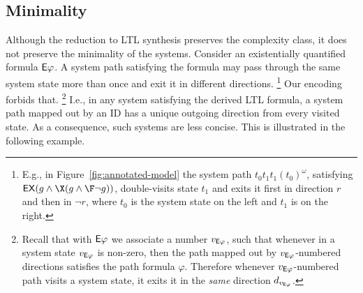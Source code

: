 \subsection*{Minimality}
Although the reduction to LTL synthesis preserves the complexity class,
it does not preserve the minimality of the systems.
Consider an existentially quantified formula ${\operatorname{\mathsf{E}}}\varphi$.
A system path satisfying the formula may pass through the same system state more than once
and exit it in different directions.%
  \footnote{%
  E.g., in Figure~\ref{fig:annotated-model} the system path $t_0 t_1 t_1 (t_0)^\omega$,
  satisfying $\EX(g\land\X(g\land\F\neg g))$,
  double-visits state $t_1$ and exits it first in direction $r$ and then in $\neg r$,
  where $t_0$ is the system state on the left and $t_1$ is on the right.}
Our encoding forbids that.%
  \footnote{%
  Recall that with ${\operatorname{\mathsf{E}}}\varphi$ we associate a number $v_{{\operatorname{\mathsf{E}}}\varphi}$,
  such that whenever in a system state $v_{{\operatorname{\mathsf{E}}}\varphi}$ is non-zero,
  then the path mapped out by $v_{{\operatorname{\mathsf{E}}}\varphi}$-numbered directions satisfies the path formula $\varphi$.
  Therefore whenever $v_{{\operatorname{\mathsf{E}}}\varphi}$-numbered path visits a system state,
  it exits it in the \emph{same} direction $d_{v_{{\operatorname{\mathsf{E}}}\varphi}}$.
  }
I.e., in any system satisfying the derived LTL formula,
a system path mapped out by an ID has a unique outgoing direction from every visited state.
As a consequence, such systems are less concise.
This is illustrated in the following example.

